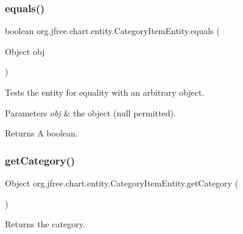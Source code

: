 \subsubsection{\texorpdfstring{equals()}{equals()}}
{\footnotesize\ttfamily boolean org.\+jfree.\+chart.\+entity.\+Category\+Item\+Entity.\+equals (\begin{DoxyParamCaption}\item[{Object}]{obj }\end{DoxyParamCaption})}

Tests the entity for equality with an arbitrary object.


\begin{DoxyParams}{Parameters}
{\em obj} & the object ({\ttfamily null} permitted).\\
\hline
\end{DoxyParams}
\begin{DoxyReturn}{Returns}
A boolean. 
\end{DoxyReturn}
\mbox{\label{classorg_1_1jfree_1_1chart_1_1entity_1_1_category_item_entity_ae666760c5bb7e48704f020551dec0b5b}} 
\subsubsection{\texorpdfstring{get\+Category()}{getCategory()}}
{\footnotesize\ttfamily Object org.\+jfree.\+chart.\+entity.\+Category\+Item\+Entity.\+get\+Category (\begin{DoxyParamCaption}{ }\end{DoxyParamCaption})}

Returns the category.

